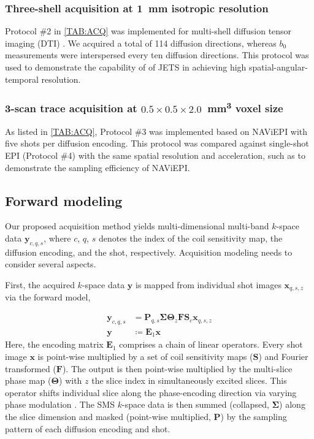 \documentclass[preprint,12pt,authoryear,review]{elsarticle}
\begin{document}
    \subsubsection{Three-shell acquisition
    at \SI{1}{\milli\meter} isotropic resolution}

    Protocol \#2 in \cref{TAB:ACQ} was implemented
    for multi-shell diffusion tensor imaging (DTI)
    \citep{basser_1994_dmri}.
    We acquired a total of 114 diffusion directions,
    whereas $b_0$ measurements were interspersed
    every ten diffusion directions.
    This protocol was used to demonstrate
    the capability of of JETS in achieving high
    spatial-angular-temporal resolution.


    \subsubsection{3-scan trace acquisition at $0.5\times0.5\times2.0$~\si{\cubic\milli\meter} voxel size}

    As listed in \cref{TAB:ACQ},
    Protocol \#3 was implemented based on
    NAViEPI with five shots per diffusion encoding.
    This protocol was compared against single-shot EPI (Protocol \#4)
    with the same spatial resolution and acceleration,
    such as to demonstrate the sampling efficiency of NAViEPI.


    \subsection{Forward modeling}
    Our proposed acquisition method yields
    multi-dimensional multi-band
    $k$-space data $\mathbf{y}_{c,q,s}$,
    where $c$, $q$, $s$ denotes the index of the coil sensitivity map,
    the diffusion encoding, and the shot, respectively.
    Acquisition modeling needs to consider several aspects.

    First, the acquired $k$-space data $\mathbf{y}$ is mapped from
    individual shot images $\mathbf{x}_{q,s,z}$ via the forward model,

    \begin{align}
        \mathbf{y}_{c,q,s} &= \mathbf{P}_{q,s} \mathbf{\Sigma} \mathbf{\Theta}_{z} \mathbf{F} \mathbf{S}_c \mathbf{x}_{q,s,z} \nonumber \\
        \mathbf{y} &\coloneqq \mathbf{E}_1 \mathbf{x} \label{EQU:model_shot}
    \end{align}
    Here, the encoding matrix $\mathbf{E}_1$ comprises
    a chain of linear operators.
    Every shot image $\mathbf{x}$ is point-wise multiplied
    by a set of coil sensitivity maps ($\mathbf{S}$) and Fourier transformed ($\mathbf{F}$).
    The output is then point-wise multiplied by the multi-slice phase map ($\mathbf{\Theta}$)
    with $z$ the slice index in simultaneously excited slices.
    This operator shifts individual slice
    along the phase-encoding direction
    via varying phase modulation \citep{breuer_2005_caipi}.
    The SMS $k$-space data is then
    summed (collapsed, $\mathbf{\Sigma}$) along the slice dimension and
    masked (point-wise multiplied, $\mathbf{P}$) by
    the sampling pattern of each diffusion encoding and shot.
\end{document}
